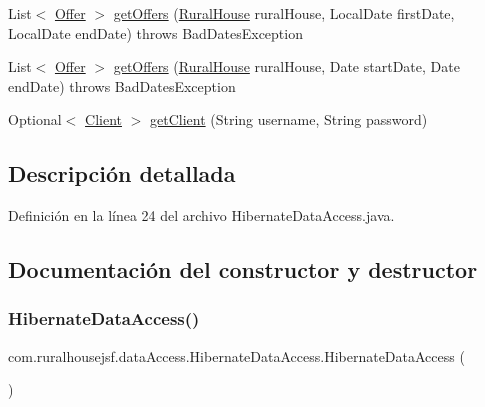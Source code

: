 \begin{DoxyCompactItemize}
List$<$ \mbox{\hyperlink{classcom_1_1ruralhousejsf_1_1domain_1_1_offer}{Offer}} $>$ \mbox{\hyperlink{classcom_1_1ruralhousejsf_1_1data_access_1_1_hibernate_data_access_a54bd9542b20644ccd47961ca260d17b4}{get\+Offers}} (\mbox{\hyperlink{classcom_1_1ruralhousejsf_1_1domain_1_1_rural_house}{Rural\+House}} rural\+House, Local\+Date first\+Date, Local\+Date end\+Date)  throws Bad\+Dates\+Exception 
\item 
List$<$ \mbox{\hyperlink{classcom_1_1ruralhousejsf_1_1domain_1_1_offer}{Offer}} $>$ \mbox{\hyperlink{classcom_1_1ruralhousejsf_1_1data_access_1_1_hibernate_data_access_ad428053d12fae95599312c13951f9c87}{get\+Offers}} (\mbox{\hyperlink{classcom_1_1ruralhousejsf_1_1domain_1_1_rural_house}{Rural\+House}} rural\+House, Date start\+Date, Date end\+Date)  throws Bad\+Dates\+Exception 
\item 
Optional$<$ \mbox{\hyperlink{classcom_1_1ruralhousejsf_1_1domain_1_1_client}{Client}} $>$ \mbox{\hyperlink{classcom_1_1ruralhousejsf_1_1data_access_1_1_hibernate_data_access_a6df6a0502595b73be0f6d238743eeda5}{get\+Client}} (String username, String password)
\end{DoxyCompactItemize}


\subsection{Descripción detallada}


Definición en la línea 24 del archivo Hibernate\+Data\+Access.\+java.



\subsection{Documentación del constructor y destructor}
\mbox{\label{classcom_1_1ruralhousejsf_1_1data_access_1_1_hibernate_data_access_a8e0ec929d78d37a992837db0ba7e9602}} 
\subsubsection{\texorpdfstring{HibernateDataAccess()}{HibernateDataAccess()}}
{\footnotesize\ttfamily com.\+ruralhousejsf.\+data\+Access.\+Hibernate\+Data\+Access.\+Hibernate\+Data\+Access (\begin{DoxyParamCaption}{ }\end{DoxyParamCaption})}



